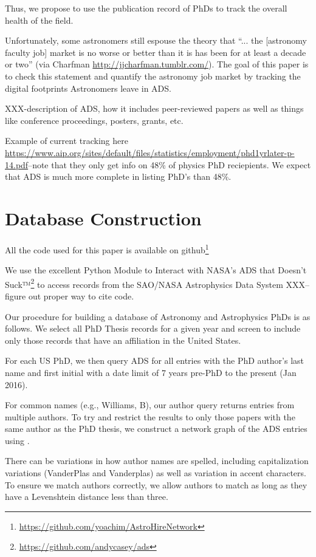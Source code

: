 \documentclass{emulateapj}
\begin{document}
Thus, we propose to use the publication record of PhDs to track the overall health of the field.  

Unfortunately, some astronomers still espouse the theory that ``... the [astronomy faculty job] market is no worse or better than it is has been for at least a decade or two'' (via Charfman \url{http://jjcharfman.tumblr.com/}).  The goal of this paper is to check this statement and quantify the astronomy job market by tracking the digital footprints Astronomers leave in ADS. 

XXX-description of ADS, how it includes peer-reviewed papers as well as things like conference proceedings, posters, grants, etc.

Example of current tracking here \url{https://www.aip.org/sites/default/files/statistics/employment/phd1yrlater-p-14.pdf}--note that they only get info on 48\% of physics PhD reciepients.  We expect that ADS is much more complete in listing PhD's than 48\%.


\section{Database Construction}\label{sec:db_construct}

All the code used for this paper is available on github\footnote{\url{https://github.com/yoachim/AstroHireNetwork}}

We use the excellent Python Module to Interact with NASA's ADS that Doesn't Suck™\footnote{\url{https://github.com/andycasey/ads}} to access records from the SAO/NASA Astrophysics Data System XXX--figure out proper way to cite code. 

Our procedure for building a database of Astronomy and Astrophysics PhDs is as follows.  We select all PhD Thesis records for a given year and screen to include only those records that have an affiliation in the United States.

For each US PhD, we then query ADS for all entries with the PhD author's last name and first initial with a date limit of 7 years pre-PhD to the present (Jan 2016).

For common names (e.g.,  Williams, B), our author query returns entries from multiple authors.  To try and restrict the results to only those papers with the same author as the PhD thesis, we construct a network graph of the ADS entries using \citet{networkx}.

There can be variations in how author names are spelled, including capitalization variations (VanderPlas and Vanderplas) as well as variation in accent characters.  To ensure we match authors correctly, we allow authors to match as long as they have a Levenshtein distance less than three.
\end{document}

